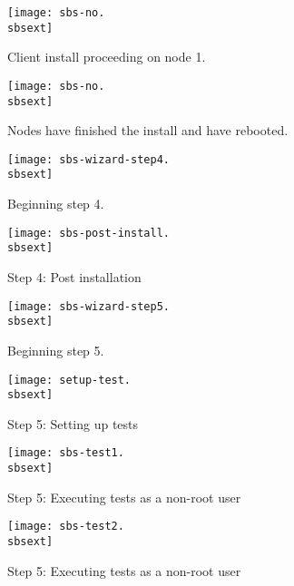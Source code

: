 \begin{figure}[htbp]
  \begin{center}
    \texttt{[image: sbs-no.\\sbsext]}
    \caption{Client install proceeding on node 1.}
    \label{fig:sbs-node1-install}
  \end{center}
\end{figure}

\begin{figure}[htbp]
  \begin{center}
    \texttt{[image: sbs-no.\\sbsext]}
    \caption{Nodes have finished the install and have rebooted.}
    \label{fig:sbs-node1-login}
  \end{center}
\end{figure}

\begin{figure}[htbp]
  \begin{center}
    \texttt{[image: sbs-wizard-step4.\\sbsext]}
    \caption{Beginning step 4.}
    \label{fig:sbs-install-wizard-s4}
  \end{center}
\end{figure}

\begin{figure}[htbp]
  \begin{center}
    \texttt{[image: sbs-post-install.\\sbsext]}
    \caption{Step 4: Post installation}
    \label{fig:sbs-post-install}
  \end{center}
\end{figure}

\begin{figure}[htbp]
  \begin{center}
    \texttt{[image: sbs-wizard-step5.\\sbsext]}
    \caption{Beginning step 5.}
    \label{fig:sbs-install-wizard-s5}
  \end{center}
\end{figure}

\begin{figure}[htbp]
  \begin{center}
    \texttt{[image: setup-test.\\sbsext]}
    \caption{Step 5: Setting up tests}
    \label{fig:sbs-setup-test}
  \end{center}
\end{figure}

\begin{figure}[htbp]
  \begin{center}
    \texttt{[image: sbs-test1.\\sbsext]}
    \caption{Step 5: Executing tests as a non-root user}
    \label{fig:sbs-test1}
  \end{center}
\end{figure}

\begin{figure}[htbp]
  \begin{center}
    \texttt{[image: sbs-test2.\\sbsext]}
    \caption{Step 5: Executing tests as a non-root user}
    \label{fig:sbs-test2}
  \end{center}
\end{figure}


\clearpage

